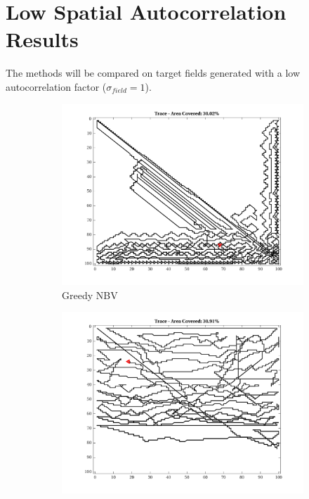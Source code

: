 \FloatBarrier
\clearpage

\section{Low Spatial Autocorrelation Results}
The methods will be compared on target fields generated with a low autocorrelation factor ($\sigma_{field}=1$).

\begin{figure}[htb!]
    \centering
    \begin{subfigure}[t]{0.25\textwidth}
        \centering
        \includegraphics[width=\linewidth]{figures/path_greedy_30p_100x100_sf_1_seed_1.png}
        \captionsetup{skip=0.20\baselineskip,size=footnotesize}
        \caption{Greedy NBV}
    \end{subfigure}%
    \begin{subfigure}[t]{0.25\textwidth}
        \centering
        \includegraphics[width=\linewidth]{figures/path_mc_30p_100x100_sf_1_seed_1.png}

\end{subfigure}
\end{figure}
